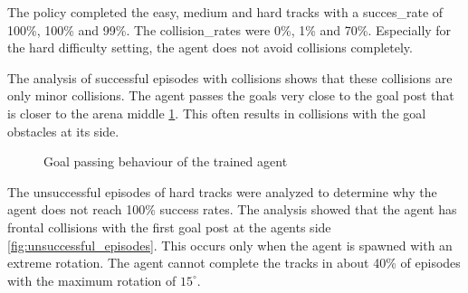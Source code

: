 The policy completed the easy, medium and hard tracks with a succes\_rate of 100\%, 100\% and 99\%. 
The collision\_rates were 0\%, 1\% and  70\%. Especially for the hard difficulty setting, the agent does not avoid collisions completely. 

The analysis of successful episodes with collisions shows that these collisions are only minor collisions. The agent passes the goals very close to the goal post that is closer to the arena middle \ref{fig:agent_behaviour}. This often results in collisions with the goal obstacles at its side.

\begin{figure}
    \centering
    \caption{Goal passing behaviour of the trained agent}
    \label{fig:agent_behaviour}
\end{figure}

The unsuccessful episodes of hard tracks were analyzed to determine why the agent does not reach 100\% success rates. The analysis showed that the agent has frontal collisions with the first goal post at the agents side \ref{fig:unsuccessful_episodes}. This occurs only when the agent is spawned with an extreme rotation. The agent cannot complete the tracks in about 40\% of episodes with the maximum rotation of $15^{\circ}$.

